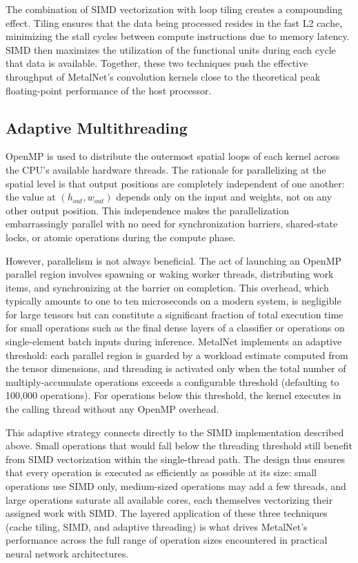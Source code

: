 \documentclass[12pt,oneside,a4paper]{report}
\begin{document}
The combination of SIMD vectorization with loop tiling creates a compounding effect. Tiling ensures that the data being processed resides in the fast L2 cache, minimizing the stall cycles between compute instructions due to memory latency. SIMD then maximizes the utilization of the functional units during each cycle that data is available. Together, these two techniques push the effective throughput of MetalNet's convolution kernels close to the theoretical peak floating-point performance of the host processor.

\subsection{Adaptive Multithreading}

OpenMP is used to distribute the outermost spatial loops of each kernel across the CPU's available hardware threads. The rationale for parallelizing at the spatial level is that output positions are completely independent of one another: the value at $(h_{out}, w_{out})$ depends only on the input and weights, not on any other output position. This independence makes the parallelization embarrassingly parallel with no need for synchronization barriers, shared-state locks, or atomic operations during the compute phase.

However, parallelism is not always beneficial. The act of launching an OpenMP parallel region involves spawning or waking worker threads, distributing work items, and synchronizing at the barrier on completion. This overhead, which typically amounts to one to ten microseconds on a modern system, is negligible for large tensors but can constitute a significant fraction of total execution time for small operations such as the final dense layers of a classifier or operations on single-element batch inputs during inference. MetalNet implements an adaptive threshold: each parallel region is guarded by a workload estimate computed from the tensor dimensions, and threading is activated only when the total number of multiply-accumulate operations exceeds a configurable threshold (defaulting to 100,000 operations). For operations below this threshold, the kernel executes in the calling thread without any OpenMP overhead.

This adaptive strategy connects directly to the SIMD implementation described above. Small operations that would fall below the threading threshold still benefit from SIMD vectorization within the single-thread path. The design thus ensures that every operation is executed as efficiently as possible at its size: small operations use SIMD only, medium-sized operations may add a few threads, and large operations saturate all available cores, each themselves vectorizing their assigned work with SIMD. The layered application of these three techniques (cache tiling, SIMD, and adaptive threading) is what drives MetalNet's performance across the full range of operation sizes encountered in practical neural network architectures.
\end{document}

